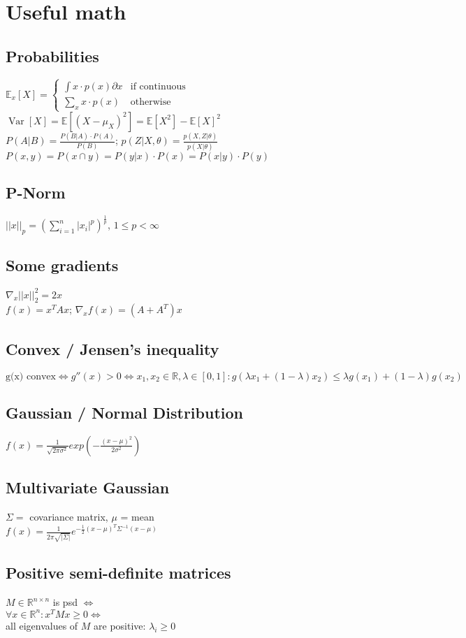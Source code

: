 \section*{Useful math}

\subsection*{Probabilities}
$\mathbb{E}_x[X] = \begin{cases}
   \int x \cdot p(x) \partial x  & \text{if continuous}\\
   \sum_x x \cdot p(x) & \text{otherwise}
  \end{cases}$\\
$\operatorname{Var}[X] = \mathbb{E}[(X-\mu_X)^2] = \mathbb{E}[X^2] - \mathbb{E}[X]^2$\\
$P(A|B) = \frac{P(B|A) \cdot P(A)}{P(B)}$; $p(Z|X,\theta) = \frac{p(X,Z|\theta)}{p(X|\theta)}$\\
$P(x,y) = P(x \cap y)= P(y|x) \cdot P(x) = P(x|y) \cdot P(y)$

\subsection*{P-Norm}
$||x||_p = (\sum_{i=1}^n|x_i|^p)^{\frac{1}{p}}$, $1 \leq p < \infty$

\subsection*{Some gradients}
$\nabla_x ||x||_2^2 = 2 x$\\
$f(x) = x^T A x$; $\nabla_x f(x) = (A + A^T) x$

\subsection*{Convex / Jensen's inequality}
$\text{g(x) convex} \Leftrightarrow g''(x) > 0 \Leftrightarrow x_1,x_2 \in \mathbb{R}, \lambda \in [0,1]: 
g(\lambda x_1 + (1-\lambda) x_2) \leq \lambda g(x_1) + (1-\lambda) g(x_2)$

\subsection*{Gaussian / Normal Distribution}
$f(x) = \frac{1}{\sqrt{2\pi\sigma^2}} exp(-\frac{(x-\mu)^2}{2\sigma^2})$

\subsection*{Multivariate Gaussian}
$\Sigma =$ covariance matrix, $\mu$ = mean\\
$f(x) = \frac{1}{2\pi \sqrt{|\Sigma|}} e^{- \frac{1}{2} (x-\mu)^T \Sigma^{-1} (x-\mu)}$


\subsection*{Positive semi-definite matrices}
$M \in \mathbb{R}^{n\times n}$ is psd $\Leftrightarrow$\\
$\forall x \in \mathbb{R}^n: x^TMx \geq 0 \Leftrightarrow$\\
all eigenvalues of $M$ are positive: $\lambda_i\geq 0$

